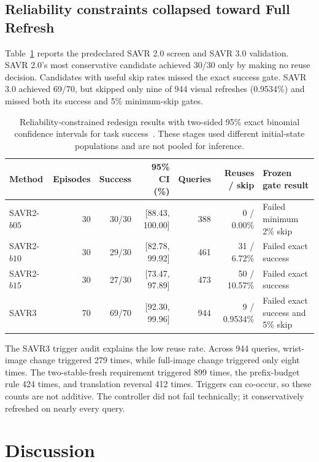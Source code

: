 \documentclass[11pt]{article}
\begin{document}
\subsection{Reliability constraints collapsed toward Full Refresh}

Table~\ref{tab:redesign} reports the predeclared SAVR 2.0 screen and SAVR 3.0 validation. SAVR 2.0's most conservative candidate achieved 30/30 only by making no reuse decision. Candidates with useful skip rates missed the exact success gate. SAVR 3.0 achieved 69/70, but skipped only nine of 944 visual refreshes (0.9534\%) and missed both its success and 5\% minimum-skip gates.

\begin{table}[H]
\centering
\small
\caption{Reliability-constrained redesign results with two-sided 95\% exact binomial confidence intervals for task success~\cite{clopperpearson}. These stages used different initial-state populations and are not pooled for inference.}
\label{tab:redesign}
\begin{tabularx}{\linewidth}{lrrrrrX}
\toprule
Method & Episodes & Success & 95\% CI (\%) & Queries & Reuses / skip & Frozen gate result \\
\midrule
SAVR2-$b05$ & 30 & 30/30 & [88.43, 100.00] & 388 & 0 / 0.00\% & Failed minimum 2\% skip \\
SAVR2-$b10$ & 30 & 29/30 & [82.78, 99.92] & 461 & 31 / 6.72\% & Failed exact success \\
SAVR2-$b15$ & 30 & 27/30 & [73.47, 97.89] & 473 & 50 / 10.57\% & Failed exact success \\
SAVR3 & 70 & 69/70 & [92.30, 99.96] & 944 & 9 / 0.9534\% & Failed exact success and 5\% skip \\
\bottomrule
\end{tabularx}
\end{table}

The SAVR3 trigger audit explains the low reuse rate. Across 944 queries, wrist-image change triggered 279 times, while full-image change triggered only eight times. The two-stable-fresh requirement triggered 899 times, the prefix-budget rule 424 times, and translation reversal 412 times. Triggers can co-occur, so these counts are not additive. The controller did not fail technically; it conservatively refreshed on nearly every query.

\section{Discussion}
\end{document}
